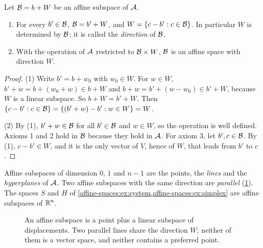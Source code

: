 \begin{notechapter}
\begin{proposition}\label{affine-spaces:prop:subspace}
Let $\mathcal{B} = b + W$ be an affine subspace of $\mathcal{A}$.
\begin{enumerate}[nosep]
  \item For every $b'\in\mathcal{B}$, $\mathcal{B} = b' + W$, and
        $W = \{c - b' : c\in\mathcal{B}\}$. In particular $W$ is determined by
        $\mathcal{B}$; it is called the \emph{direction} of $\mathcal{B}$.
  \item With the operation of $\mathcal{A}$ restricted to $\mathcal{B}\times W$, $\mathcal{B}$ is
        an affine space with direction $W$.
\end{enumerate}
\end{proposition}

\begin{proof}
(1) Write $b' = b + w_0$ with $w_0\in W$. For $w\in W$,
$b' + w = b + (w_0 + w)\in b + W$ and $b + w = b' + (w - w_0)\in b' + W$,
because $W$ is a linear subspace. So $b + W = b' + W$. Then
$\{c - b' : c\in\mathcal{B}\} = \{(b' + w) - b' : w\in W\} = W$.

(2) By (1), $b' + w\in\mathcal{B}$ for all $b'\in\mathcal{B}$ and $w\in W$, so the
operation is well defined. Axioms 1 and 2 hold in $\mathcal{B}$ because they hold
in $\mathcal{A}$. For axiom 3, let $b', c\in\mathcal{B}$. By (1), $c - b'\in W$, and it is
the only vector of $V$, hence of $W$, that leads from $b'$ to $c$.
\end{proof}

Affine subspaces of dimension $0$, $1$ and $n - 1$ are the points, the
\emph{lines} and the \emph{hyperplanes} of $\mathcal{A}$. Two affine subspaces with
the same direction are \emph{parallel}
(\cref{affine-spaces:fig:subspace}). The spaces $S$ and $H$ of
\cref{affine-spaces:ex:system,affine-spaces:ex:simplex} are affine
subspaces of $\mathbb{R}^n$.

\begin{figure}[ht]
\centering
{}
\caption{An affine subspace is a point plus a linear subspace of
displacements. Two parallel lines share the direction $W$; neither of them
is a vector space, and neither contains a preferred point.}
\label{affine-spaces:fig:subspace}
\end{figure}


\end{notechapter}
